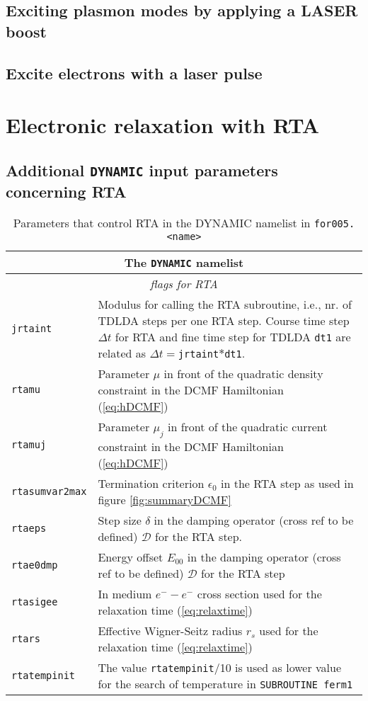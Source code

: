 \documentclass[11pt,a4paper]{article}
\begin{document}
		\subsection{Exciting plasmon modes by applying a LASER boost}
		\subsection{Excite electrons with a laser pulse}
	
	\section{Electronic relaxation with RTA}
		\subsection{Additional \texttt{DYNAMIC} input parameters concerning RTA}

			\begin{table}[h]
				\caption{Parameters that control RTA in the DYNAMIC namelist in \texttt{for005.<name>}}\label{tab:dyn-input-params-rta}
				\begin{tabular}{|p{3.5cm}|p{11.2cm}|}
					\hline
					\multicolumn{2}{|c|}{The \texttt{DYNAMIC} namelist}\\
					\hline
					\multicolumn{2}{|c|}{\textit{\color{activeColor}flags for RTA}} \\
					\hline			
					\texttt{jrtaint} &  Modulus for calling the RTA subroutine, i.e., nr. of TDLDA steps per one RTA step. Course time step $\Delta t$ for RTA and fine time step for TDLDA \texttt{dt1} are related as $\Delta t=$\texttt{jrtaint}$*$\texttt{dt1}.\\
					\hline
					\texttt{rtamu} & Parameter $\mu$ in front of the quadratic density constraint in the DCMF Hamiltonian (\ref{eq:hDCMF})\\
					\hline
					\texttt{rtamuj} & Parameter $\mu_j$ in front of the quadratic current constraint in the DCMF Hamiltonian (\ref{eq:hDCMF})\\
					\hline
					\texttt{rtasumvar2max} & Termination criterion $\epsilon_0$ in the RTA step as used in figure \ref{fig:summaryDCMF}\\
					\hline
					\texttt{rtaeps} & Step size $\delta$ in the damping operator (cross ref to be defined) $\mathcal{D}$ for the RTA step.\\
					\hline
					\texttt{rtae0dmp} & Energy offset $E_{00}$ in the damping operator (cross ref to be defined) $\mathcal{D}$ for the RTA step\\
					\hline
					\texttt{rtasigee} & In medium $e^--e^-$ cross section used for the relaxation time (\ref{eq:relaxtime})\\
					\hline
					\texttt{rtars} & Effective Wigner-Seitz radius $r_s$ used for the relaxation time (\ref{eq:relaxtime})\\
					\hline
					\texttt{rtatempinit} & The value \texttt{rtatempinit}/10 is used as lower value for the search of temperature in \texttt{SUBROUTINE ferm1}\\
					\hline
				\end{tabular}
			\end{table}
\end{document}
